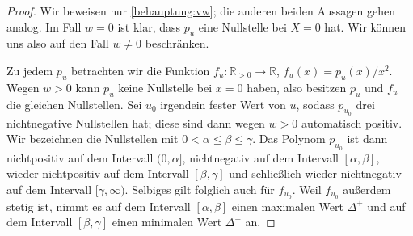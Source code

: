 \begin{proof}
	Wir beweisen nur \ref{behauptung:vw}; die anderen beiden Aussagen gehen analog. Im Fall $w=0$ ist klar, dass $p_u$ eine Nullstelle bei $X=0$ hat. Wir können uns also auf den Fall $w\neq0$ beschränken.
	
	
	Zu jedem $p_u$ betrachten wir die Funktion $f_u\colon \mathbb R_{>0}\rightarrow \mathbb R$, $f_u(x)=p_u(x)/x^2$. Wegen $w>0$ kann $p_u$ keine Nullstelle bei $x=0$ haben, also besitzen $p_u$ und $f_u$ die gleichen Nullstellen. Sei $u_0$ irgendein fester Wert von $u$, sodass $p_{u_0}$ drei nichtnegative Nullstellen hat; diese sind dann wegen $w>0$ automatisch positiv. Wir bezeichnen die Nullstellen mit $0<\alpha\leqslant \beta\leqslant \gamma$. Das Polynom $p_{u_0}$ ist dann nichtpositiv auf dem Intervall $(0,\alpha]$, nichtnegativ auf dem Intervall $[\alpha,\beta]$, wieder nichtpositiv auf dem Intervall $[\beta,\gamma]$ und schließlich wieder nichtnegativ auf dem Intervall $[\gamma,\infty)$. Selbiges gilt folglich auch für $f_{u_0}$. Weil $f_{u_0}$ außerdem stetig ist, nimmt es auf dem Intervall $[\alpha,\beta]$ einen maximalen Wert $\Delta^+$ und auf dem Intervall $[\beta,\gamma]$ einen minimalen Wert $\Delta^-$ an. 
	

\end{proof}
